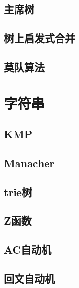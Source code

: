 \documentclass[10pt,a4paper]{article}
\begin{document}
\subsection{主席树}
\begin{spacing}{1.5}

\end{spacing}

\subsection{树上启发式合并}

\subsection{莫队算法}
\begin{spacing}{1.5}

\end{spacing}

\section{字符串}
\subsection{KMP}

\subsection{Manacher}

\subsection{trie树}

\subsection{Z函数}
\begin{spacing}{1.5}

\end{spacing}

\subsection{AC自动机}

\subsection{回文自动机}
\begin{spacing}{1.5}

\end{spacing}

\end{document}
